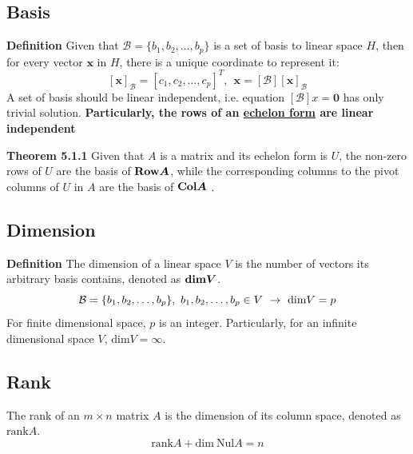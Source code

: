 \documentclass[11pt]{article}
\begin{document}
\subsection{Basis} 
\noindent \textbf{Definition} Given that $\mathcal{B} = \{b_1, b_2, \dots, b_p\}$ is a set of basis to linear space $H$, then for every vector $\bm{x}$ in $H$, there is a unique coordinate to represent it:
\begin{equation}
    \bm{[x]_{\mathcal{B}}} = [c_1, c_2, \dots, c_p]^{T},~~\bm{x} = [\mathcal{B}]\bm{[x]_{\mathcal{B}}}
\end{equation}
A set of basis should be linear independent, i.e. equation $[\mathcal{B}]x = \bm{0}$ has only trivial solution. \textbf{Particularly, the rows of an \underline{echelon form} are linear independent} \par \indent \par
\noindent \textbf{Theorem 5.1.1} Given that $A$ is a matrix and its echelon form is $U$, the non-zero rows of $U$ are the basis of $\bm{\text{\textbf{Row}}A}$, while the corresponding columns to the pivot columns of $U$ in $A$ are the basis of $\bm{\text{\textbf{Col}}A}$ .
\subsection{Dimension}
\noindent \textbf{Definition} The dimension of a linear space $V$ is the number of vectors its arbitrary basis contains, denoted as $\bm{\text{\textbf{dim}}V}$.
\begin{equation}
    \mathcal{B} = \{b_1, b_2, \dots, b_p\},~b_1,b_2,\dots,b_p \in V~ \rightarrow~\text{dim}V = p \notag
\end{equation}
For finite dimensional space, $p$ is an integer. Particularly, for an infinite dimensional space $V$, $\text{dim}V = \infty$.
\subsection{Rank}
The rank of an $m \times n$ matrix $A$ is the dimension of its column space, denoted as $\text{rank}A$.
\begin{equation}
    \text{rank}A + \text{dim}~\text{Nul}A = n
\end{equation}
\end{document}
